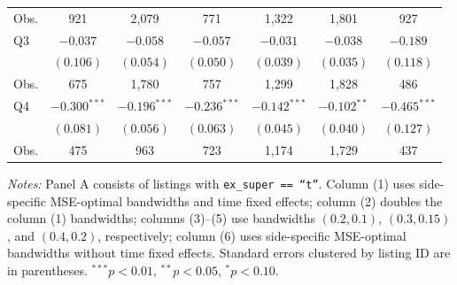 \begin{table}[!htbp]
\begin{tabular}{lcccccc}
Obs.   & 921 & 2,079 & 771 & 1,322 & 1,801 & 927 \\
\addlinespace[2pt]
Q3     & $-0.037$ & $-0.058$ & $-0.057$ & $-0.031$ & $-0.038$ & $-0.189$ \\
       & $(0.106)$ & $(0.054)$ & $(0.050)$ & $(0.039)$ & $(0.035)$ & $(0.118)$ \\
Obs.   & 675 & 1,780 & 757 & 1,299 & 1,828 & 486 \\
\addlinespace[2pt]
Q4     & $-0.300^{***}$ & $-0.196^{***}$ & $-0.236^{***}$ & $-0.142^{***}$ & $-0.102^{**}$ & $-0.465^{***}$ \\
       & $(0.081)$ & $(0.056)$ & $(0.063)$ & $(0.045)$ & $(0.040)$ & $(0.127)$ \\
Obs.   & 475 & 963 & 723 & 1,174 & 1,729 & 437 \\
\hline\hline
\end{tabular}

\vspace{2pt}
\parbox{0.96\textwidth}{\footnotesize
\textit{Notes:} Panel A consists of listings with \texttt{ex\_super == ``t''}.
Column (1) uses side-specific MSE-optimal bandwidths and time fixed effects;
column (2) doubles the column (1) bandwidths; columns (3)--(5) use bandwidths
$(0.2,0.1)$, $(0.3,0.15)$, and $(0.4,0.2)$, respectively; column (6) uses
side-specific MSE-optimal bandwidths without time fixed effects. Standard errors
clustered by listing ID are in parentheses. $^{***}p<0.01$, $^{**}p<0.05$,
$^{*}p<0.10$.}
\end{table}

